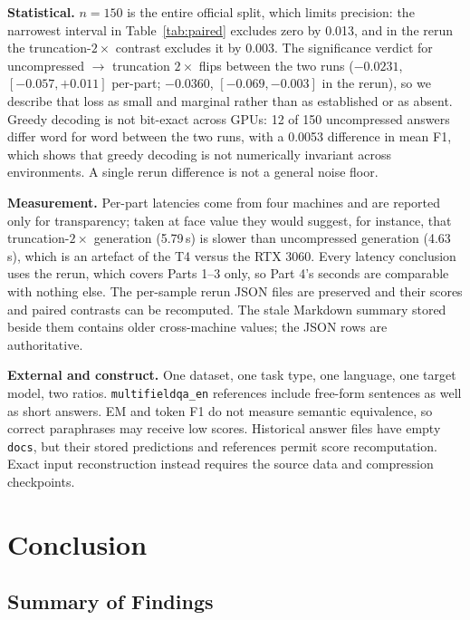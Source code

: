 ﻿\documentclass[10pt,a4paper,twocolumn]{article}
\newcommand{\MFQA}{\texttt{multifieldqa\_\allowbreak en}}
\begin{document}
\textbf{Statistical.} $n=150$ is the entire official split, which limits
precision: the narrowest interval in Table~\ref{tab:paired} excludes zero by
0.013, and in the rerun the truncation-$2\times$ contrast excludes it by 0.003.
The significance verdict for uncompressed $\rightarrow$ truncation $2\times$
flips between the two runs ($-0.0231$, $[-0.057, +0.011]$ per-part;
$-0.0360$, $[-0.069, -0.003]$ in the rerun), so we describe that loss as
small and marginal rather than as established or as absent. Greedy decoding is not bit-exact across
GPUs: 12 of 150 uncompressed answers differ word for word between the two runs,
with a 0.0053 difference in mean F1, which shows that greedy decoding is not numerically invariant across environments. A single rerun difference is not a general noise floor.

\textbf{Measurement.} Per-part latencies come from four machines and are reported
only for transparency; taken at face value they would suggest, for instance, that
truncation-$2\times$ generation (5.79\,s) is slower than uncompressed generation
(4.63\,s), which is an artefact of the T4 versus the RTX 3060. Every latency
conclusion uses the rerun, which covers Parts 1--3 only, so Part 4's seconds are
comparable with nothing else. The per-sample rerun JSON files are preserved and their scores and paired
contrasts can be recomputed. The stale Markdown summary stored beside them
contains older cross-machine values; the JSON rows are authoritative.

\textbf{External and construct.} One dataset, one task type, one language, one
target model, two ratios. \MFQA{} references include free-form sentences as well as short answers. EM and token F1 do not measure semantic equivalence, so correct paraphrases may receive low scores. Historical answer files have empty \texttt{docs}, but their stored predictions and references permit score recomputation. Exact input reconstruction instead requires the source data and compression checkpoints.

\section{Conclusion}

\subsection{Summary of Findings}
\label{sec:summary}
\end{document}
